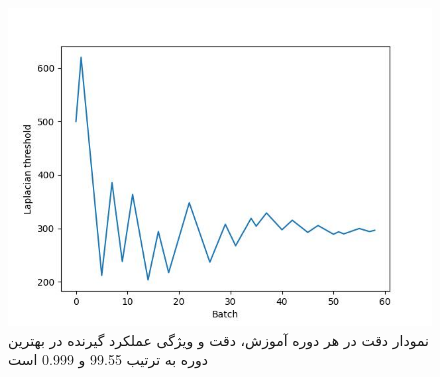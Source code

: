 \begin{figure}
	\begin{center}
		\includegraphics[width=0.8\linewidth]{figs/introduction/subs/challenges/laplacian_threshold_history_chart.jpeg}
	\end{center}
	\caption{نمودار دقت در هر دوره آموزش، دقت و ویژگی عملکرد گیرنده در بهترین دوره به ترتیب 99.55 و 0.999 است}
	\label{nci_dataset_with_resnet101_results}
\end{figure}





